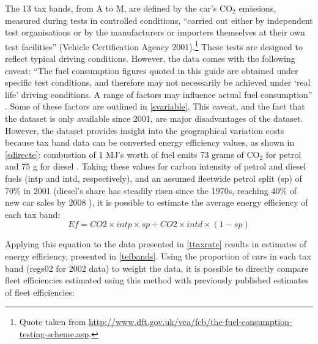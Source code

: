 \documentclass[a4paper, 11pt, twoside]{Thesis}
\begin{document}
The 13 tax bands, from A to M, are defined by the car's CO$_2$ emissions, measured
during tests in controlled conditions, ``carried out either by independent test
organisations or by the manufacturers or importers themselves at their own test
facilities'' (Vehicle Certification Agency 2001)⁠.\footnote{Quote taken from
\href{http://www.dft.gov.uk/vca/fcb/the-fuel-consumption-testing-scheme.asp}
{http://www.dft.gov.uk/vca/fcb/the-fuel-consumption-testing-scheme.asp}.
}
These tests are designed to reflect typical driving
conditions. However, the data comes with the following caveat: ``The fuel
consumption figures quoted in this guide are obtained under specific test
conditions, and therefore may not necessarily be achieved under `real life'
driving conditions. A range of factors may influence actual fuel consumption''
\citep{VehicleCertificationAgency2011}.
Some of these factors are outlined
in \cref{svariable}.
This caveat, and the fact that the dataset is only available since 2001, are major
disadvantages of the dataset. However, the dataset provides insight into
the geographical variation costs because tax band data can be
converted energy efficiency values, as shown in
\cref{sdirecte}: combustion of 1 MJ's worth of fuel emits
73
grams of CO$_2$ for petrol and 75 g for diesel \citep{Dimitriou2009}.
Taking these values for carbon intensity of petrol and diesel fuels
(intp and intd, respectively), and an assumed fleetwide petrol split (sp) of
70\% in 2001 (diesel's share has steadily risen since the 1970s, reaching 40\% of
new car sales by 2008 \citep{Bonilla2009}⁠), it is possible to estimate the average
energy efficiency of each tax band:
\begin{equation}
 Ef = CO2 \times intp \times sp + CO2 \times intd \times (1-sp)
 \label{ebands}
\end{equation}

Applying this equation to the data presented in \cref{ttaxrate} results in estimates of
energy efficiency, presented in \cref{tefbands}. Using the proportion of cars in each tax band
(regs02 for 2002 data) to weight the data, it is possible to directly compare
fleet efficiencies estimated using this method with previously published
estimates of fleet efficiencies:
\end{document}
